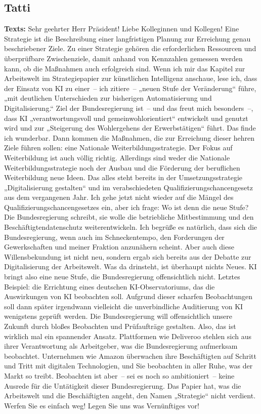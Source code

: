 \documentclass{article}
\begin{document}
\subsection{Tatti}
\noindent\textbf{Texts:} Sehr geehrter Herr Präsident! Liebe Kolleginnen und Kollegen! Eine Strategie ist die Beschreibung einer langfristigen Planung zur Erreichung genau beschriebener Ziele. Zu einer Strategie gehören die erforderlichen Ressourcen und überprüfbare Zwischenziele, damit anhand von Kennzahlen gemessen werden kann, ob die Maßnahmen auch erfolgreich sind. Wenn ich mir das Kapitel zur Arbeitswelt im Strategiepapier zur künstlichen Intelligenz anschaue, lese ich, dass der Einsatz von KI zu einer – ich zitiere – „neuen Stufe der Veränderung“ führe, „mit deutlichen Unterschieden zur bisherigen Automatisierung und Digitalisierung.“ Ziel der Bundesregierung ist – und das freut mich besonders –, dass KI „verantwortungsvoll und gemeinwohlorientiert“ entwickelt und genutzt wird und zur „Steigerung des Wohlergehens der Erwerbstätigen“ führt. Das finde ich wunderbar.  Dann kommen die Maßnahmen, die zur Erreichung dieser hehren Ziele führen sollen: eine Nationale Weiterbildungsstrategie. Der Fokus auf Weiterbildung ist auch völlig richtig. Allerdings sind weder die Nationale Weiterbildungsstrategie noch der Ausbau und die Förderung der beruflichen Weiterbildung neue Ideen.  Das alles steht bereits in der Umsetzungsstrategie „Digitalisierung gestalten“ und im verabschiedeten Qualifizierungschancengesetz aus dem vergangenen Jahr. Ich gehe jetzt nicht wieder auf die Mängel des Qualifizierungschancengesetzes ein, aber ich frage: Wo ist denn die neue Stufe?  Die Bundesregierung schreibt, sie wolle die betriebliche Mitbestimmung und den Beschäftigtendatenschutz weiterentwickeln. Ich begrüße es natürlich, dass sich die Bundesregierung, wenn auch im Schneckentempo, den Forderungen der Gewerkschaften und meiner Fraktion anzunähern scheint. Aber auch diese Willensbekundung ist nicht neu, sondern ergab sich bereits aus der Debatte zur Digitalisierung der Arbeitswelt. Was da drinsteht, ist überhaupt nichts Neues.  KI bringt also eine neue Stufe, die Bundesregierung offensichtlich nicht. Letztes Beispiel: die Errichtung eines deutschen KI-Observatoriums, das die Auswirkungen von KI beobachten soll. Aufgrund dieser scharfen Beobachtungen soll dann später irgendwann vielleicht die unverbindliche Auditierung von KI wenigstens geprüft werden. Die Bundesregierung will offensichtlich unsere Zukunft durch bloßes Beobachten und Prüfaufträge gestalten. Also, das ist wirklich mal ein spannender Ansatz.  Plattformen wie Deliveroo stehlen sich aus ihrer Verantwortung als Arbeitgeber, was die Bundesregierung aufmerksam beobachtet. Unternehmen wie Amazon überwachen ihre Beschäftigten auf Schritt und Tritt mit digitalen Technologien, und Sie beobachten in aller Ruhe, was der Markt so treibt. Beobachten ist aber – sei es noch so ambitioniert – keine Ausrede für die Untätigkeit dieser Bundesregierung.  Das Papier hat, was die Arbeitswelt und die Beschäftigten angeht, den Namen „Strategie“ nicht verdient. Werfen Sie es einfach weg! Legen Sie uns was Vernünftiges vor!  
\end{document}
